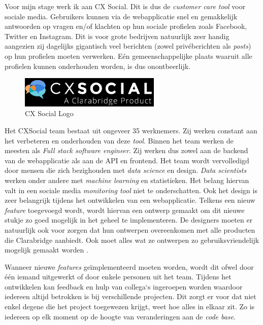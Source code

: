 Voor mijn stage werk ik aan CX Social. Dit is dus de \textit{customer care tool} voor sociale media. Gebruikers kunnen via de webapplicatie snel en gemakkelijk antwoorden op vragen en/of klachten op hun sociale profielen zoals Facebook, Twitter en Instagram. Dit is voor grote bedrijven natuurlijk zeer handig aangezien zij dagelijks gigantisch veel berichten (zowel priv\'{e}berichten als \textit{posts}) op hun profielen moeten verwerken. E\'{e}n gemeenschappelijke plaats waaruit alle profielen kunnen onderhouden worden, is dus onontbeerlijk. 

\begin{figure}[H]
	\centering
	\includegraphics[width=0.6\textwidth]{Figuren/CXSocialLogo.png}
	\caption{CX Social Logo \cite{CXSOcialLogo}} 
	\label{fig:CXSocialLogo}
\end{figure} 

Het CXSocial team bestaat uit ongeveer 35 werknemers. Zij werken constant aan het verbeteren en onderhouden van deze \textit{tool}.  Binnen het team werken de meesten als \textit{Full stack software engineer}. Zij werken dus zowel aan de backend van de webapplicatie als aan de API en frontend. Het team wordt vervolledigd door mensen die zich bezighouden met \textit{data science} en design. \textit{Data scientists} werken onder andere met \textit{machine learning} en statistieken. Het belang hiervan valt in een sociale media \textit{monitoring tool} niet te onderschatten. Ook het design is zeer belangrijk tijdens het ontwikkelen van een webapplicatie. Telkens een nieuw \textit{feature} toegevoegd wordt, wordt hiervan een ontwerp gemaakt om dit nieuwe stukje zo goed mogelijk in het geheel te implementeren. De designers moeten er natuurlijk ook voor zorgen dat hun ontwerpen overeenkomen met alle producten die Clarabridge aanbiedt. Ook moet alles wat ze ontwerpen zo gebruiksvriendelijk mogelijk gemaakt worden \cite{EngagorTeam}. 

Wanneer nieuwe \textit{features} ge\"{i}mplementeerd moeten worden, wordt dit ofwel door \'{e}\'{e}n iemand uitgewerkt of door enkele personen uit het team. Tijdens het ontwikkelen kan feedback en hulp van collega`s ingeroepen worden waardoor iedereen altijd betrokken is bij verschillende projecten. Dit zorgt er voor dat niet enkel degene die het project toegewezen krijgt, weet hoe alles in elkaar zit. Zo is iedereen op elk moment op de hoogte van veranderingen aan de \textit{code base}. 

